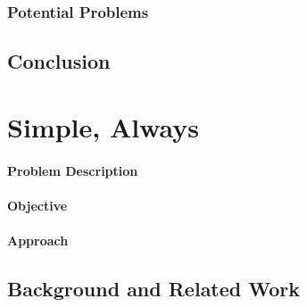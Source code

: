 \documentclass[a4paper]{article}
\begin{document}

\subsubsection{Potential Problems} %
\label{sec:HungarianNotation_potentialProblems}



\subsection{Conclusion} %
\label{sec:HungarianNotation_conclusion}



\section{Simple, Always} %
\label{sec:SimpleAlways}

\paragraph{Problem Description} %
\label{sec:SimpleAlways_problem}


\paragraph{Objective} %
\label{sec:SimpleAlways_objective}


\paragraph{Approach} %
\label{sec:SimpleAlways_approach}


\subsection{Background and Related Work} %
\label{sec:SimpleAlways_background}
\end{document}
